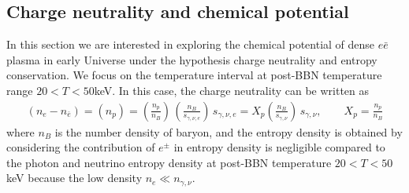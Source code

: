 \documentclass[universe,article,submit,moreauthors,pdftex,a4paper]{Definitions/mdpi}
\begin{document}
\subsection{Charge neutrality and chemical potential}
 In this section we are interested in exploring the chemical potential of dense $e\bar e$ plasma in early Universe under the hypothesis charge neutrality and entropy conservation. We focus on the temperature interval at post-BBN temperature range $20<T<50$keV. In this case, the charge neutrality can be written as
\begin{align}
  \label{density_proton}
  \left(n_{e}-n_{\bar{e}}\right)=(n_{p})=\left(\frac{n_{p}}{n_{B}}\right)\,\left(\frac{n_{B}}{s_{\gamma,\nu,e}}\right)\,s_{\gamma,\nu,e}= X_p\left(\frac{n_B}{s_{\gamma,\nu}}\right)\,s_{\gamma,\nu},\qquad X_p=\frac{n_p}{n_B}
\end{align}
where $n_B$ is the number density of baryon, and the entropy density is obtained by considering the contribution of $e^\pm$ in entropy density is negligible compared to the photon and neutrino entropy density at post-BBN temperature $20<T<50$keV because the low density $n_e\ll n_{\gamma,\nu}$. 
\end{document}
